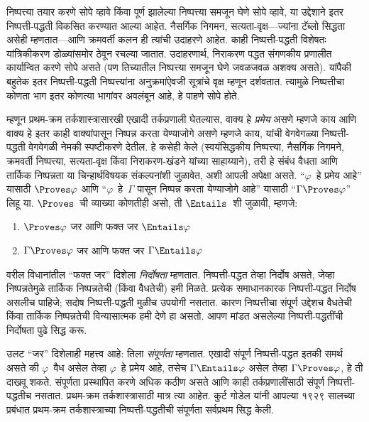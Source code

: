\documentclass[11pt,a4paper,openany]{book}
\theoremstyle{definition}
\begin{document}
निष्पत्त्या तयार करणे सोपे व्हावे किंवा पूर्ण झालेल्या
निष्पत्त्या समजून घेणे सोपे व्हावे, या उद्देशाने इतर
निष्पत्ती-पद्धती विकसित करण्यात आल्या आहेत. नैसर्गिक निगमन,
सत्यता-वृक्ष---ज्यांना टॅब्लो सिद्धता असेही म्हणतात---आणि क्रमवर्ती कलन
ही त्यांची उदाहरणे आहेत. काही निष्पत्ती-पद्धती विशेषतः
यांत्रिकीकरण डोळ्यांसमोर ठेवून रचल्या जातात. उदाहरणार्थ, निराकरण पद्धत
संगणकीय प्रणालीत कार्यान्वित करणे सोपे असते (पण तिच्यातील
निष्पत्त्या समजून घेणे जवळजवळ अशक्य असते). यांपैकी बहुतेक इतर
निष्पत्ती-पद्धती निष्पत्त्यांना अनुक्रमांऐवजी सूत्रांचे
वृक्ष म्हणून दर्शवतात. त्यामुळे निष्पत्तीचा कोणता भाग इतर
कोणत्या भागांवर अवलंबून आहे, हे पाहणे सोपे होते.

म्हणून प्रथम-क्रम तर्कशास्त्रासारखी एखादी तर्कप्रणाली घेतल्यास,
वाक्य हे \emph{प्रमेय} असणे म्हणजे काय आणि वाक्य हे
इतर काही वाक्यांपासून निष्पन्न करता येण्याजोगे असणे म्हणजे काय, यांची
वेगवेगळ्या निष्पत्ती-पद्धती वेगवेगळी नेमकी स्पष्टीकरणे देतील. हे
कसेही केले (स्वयंसिद्धकीय निष्पत्त्या, नैसर्गिक निगमने, क्रमवर्ती
निष्पत्त्या, सत्यता-वृक्ष किंवा निराकरण-खंडने यांच्या साहाय्याने),
तरी हे संबंध वैधता आणि तार्किक निष्पन्नता या चिन्हार्थविषयक संकल्पनांशी
जुळावेत, अशी आपली अपेक्षा असते. ``$\varphi$~हे प्रमेय आहे'' यासाठी
$\Proves \varphi$ आणि ``$\varphi$~हे~$\Gamma$ पासून निष्पन्न करता येण्याजोगे आहे'' यासाठी
``$\Gamma \Proves \varphi$'' लिहू या. $\Proves$~ची व्याख्या कोणतीही असो,
ती $\Entails$~शी जुळावी, म्हणजे:
\begin{enumerate}
\item $\Proves \varphi$ जर आणि फक्त जर $\Entails \varphi$
\item $\Gamma \Proves \varphi$ जर आणि फक्त जर $\Gamma \Entails \varphi$
\end{enumerate}
वरील विधानांतील ``फक्त जर'' दिशेला \emph{निर्दोषता} म्हणतात.
निष्पत्ती-पद्धत तेव्हा निर्दोष असते, जेव्हा निष्पन्नतेमुळे
तार्किक निष्पन्नतेची (किंवा वैधतेची) हमी मिळते. प्रत्येक समाधानकारक
निष्पत्ती-पद्धत निर्दोष असलीच पाहिजे; सदोष निष्पत्ती-पद्धती
मुळीच उपयोगी नसतात. कारण निष्पत्तीचा संपूर्ण उद्देशच वैधतेची
किंवा तार्किक निष्पन्नतेची विन्यासात्मक हमी देणे हा असतो. आपण मांडत
असलेल्या निष्पत्ती-पद्धतींची निर्दोषता पुढे सिद्ध करू.

उलट ``जर'' दिशेलाही महत्त्व आहे: तिला \emph{संपूर्णता} म्हणतात.
एखादी संपूर्ण निष्पत्ती-पद्धत इतकी समर्थ असते की $\varphi$~वैध असेल
तेव्हा $\varphi$~हे प्रमेय आहे, तसेच $\Gamma \Entails \varphi$ असेल तेव्हा
$\Gamma \Proves \varphi$, हे ती दाखवू शकते. संपूर्णता प्रस्थापित करणे अधिक
कठीण असते आणि काही तर्कप्रणालींसाठी संपूर्ण निष्पत्ती-पद्धतीच
नसतात. प्रथम-क्रम तर्कशास्त्रासाठी मात्र त्या आहेत. कुर्ट गोडेल यांनी
आपल्या १९२९ सालच्या प्रबंधात प्रथम-क्रम तर्कशास्त्राच्या
निष्पत्ती-पद्धतीची संपूर्णता सर्वप्रथम सिद्ध केली.
\end{document}
